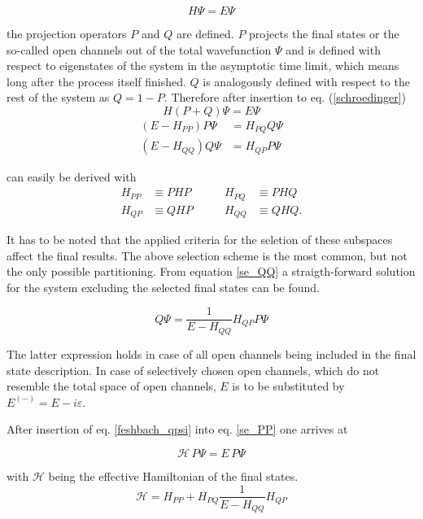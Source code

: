 \begin{equation}
  H \Psi = E \Psi \label{schroedinger}
\end{equation}

the projection operators $P$ and $Q$ are defined. $P$ projects the final states
or the so-called open channels out
of the total wavefunction $\Psi$ and is defined with respect to eigenstates
of the system in the asymptotic time limit, which means long after the process
itself finished. $Q$ is analogously defined with respect to the rest of the
system as $Q = 1 - P$. Therefore after insertion to eq. (\ref{schroedinger})
\begin{equation}
  H (P+Q) \Psi = E \Psi
\end{equation}
\begin{align}
  (E - H_{PP}) P \Psi & = H_{PQ} Q \Psi \label{se_PP}\\
  (E - H_{QQ}) Q \Psi & = H_{QP} P \Psi \label{se_QQ}
\end{align}

can easily be derived with
\begin{align*}
  H_{PP} & \equiv PHP & \quad\quad H_{PQ} & \equiv PHQ\\
  H_{QP} & \equiv QHP & \quad\quad H_{QQ} & \equiv QHQ .
\end{align*}

It has to be noted that the applied criteria for the seletion of
these subspaces affect the final results. The above selection scheme is the
most common, but not the only possible partitioning.
From equation \ref{se_QQ} a straigth-forward solution for the system excluding
the selected final states can be found.

\begin{equation}
  Q \Psi = \frac{1}{E-H_{QQ}} H_{QP} P \Psi \label{feshbach_qpsi}
\end{equation}

The latter expression holds in case of all open channels being included
in the final state description.
In case of selectively chosen open channels, which do not resemble the total
space of open channels,
$E$ is to be substituted by $E^{(-)}=E - i\varepsilon$.

After insertion of eq. \ref{feshbach_qpsi} into eq. \ref{se_PP} one arrives at

\begin{equation}
  \mathscr{H} \,P \Psi = E \,P \Psi \label{se_ppsi}
\end{equation}

with $\mathscr{H}$ being the effective Hamiltonian of the final states.
\begin{equation}
  \mathscr{H} = H_{PP} + H_{PQ} \frac{1}{E-H_{QQ}} H_{QP}
\end{equation}

